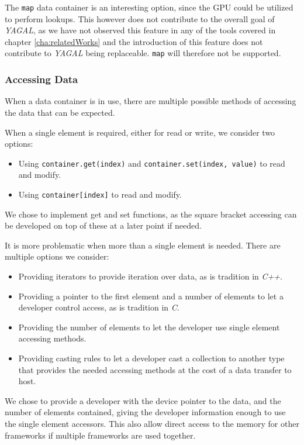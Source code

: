 The \texttt{map} data container is an interesting option, since the GPU could be utilized to perform lookups. This however does not contribute to the overall goal of \textit{YAGAL}, as we have not observed this feature in any of the tools covered in chapter \ref{cha:relatedWorks} and the introduction of this feature does not contribute to \textit{YAGAL} being replaceable. \texttt{map} will therefore not be supported.

\subsubsection{Accessing Data}
When a data container is in use, there are multiple possible methods of accessing the data that can be expected. 

When a single element is required, either for read or write, we consider two options:
\begin{itemize}
\item Using \texttt{container.get(index)} and \texttt{container.set(index, value)} to read and modify.
\item Using \texttt{container[index]} to read and modify.
\end{itemize}
We chose to implement get and set functions, as the square bracket accessing can be developed on top of these at a later point if needed.

It is more problematic when more than a single element is needed. There are multiple options we consider:
\begin{itemize}
\item Providing iterators to provide iteration over data, as is tradition in \textit{C++}.
\item Providing a pointer to the first element and a number of elements to let a developer control access, as is tradition in \textit{C}.
\item Providing the number of elements to let the developer use single element accessing methods.
\item Providing casting rules to let a developer cast a collection to another type that provides the needed accessing methods at the cost of a data transfer to host.
\end{itemize}
We chose to provide a developer with the device pointer to the data, and the number of elements contained, giving the developer information enough to use the single element accessors. This also allow direct access to the memory for other frameworks if multiple frameworks are used together.

